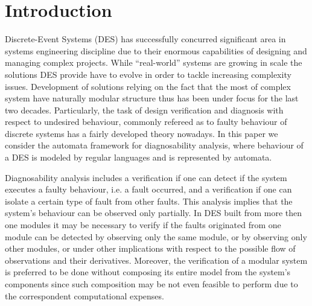 \documentclass[a4paper, 10pt, conference]{ieeeconf}
\begin{document}
\section{Introduction}

Discrete-Event Systems (DES) has successfully concurred significant area in
systems engineering discipline due to their enormous capabilities of designing
and managing complex projects. While ``real-world'' systems are growing in scale
the solutions DES provide have to evolve in order to tackle increasing
complexity issues. Development of solutions relying on the fact that the most of
complex system have naturally modular structure thus has been under focus for
the last two decades. Particularly, the task of design verification and
diagnosis with respect to undesired behaviour, commonly refereed as to faulty
behaviour of discrete systems has a fairly developed theory nowadays.
In this paper we consider the automata framework for diagnosability analysis,
where behaviour of a DES is modeled by regular languages and is represented by
automata.

Diagnosability analysis includes a verification if one can detect if the system
executes a faulty behaviour, i.e. a fault occurred, and a verification if one
can isolate a certain type of fault from other faults. This analysis implies
that the system's behaviour can be observed only partially. In DES built from more
then one modules it may be necessary to verify if the faults originated from one
module can be detected by observing only the same module, or by observing only
other modules, or under other implications with respect to the possible flow of
observations and their derivatives. Moreover, the verification of a modular
system is preferred to be done without composing its entire model from the
system's components since such composition may be not even feasible to perform
due to the correspondent computational expenses.

\end{document}
